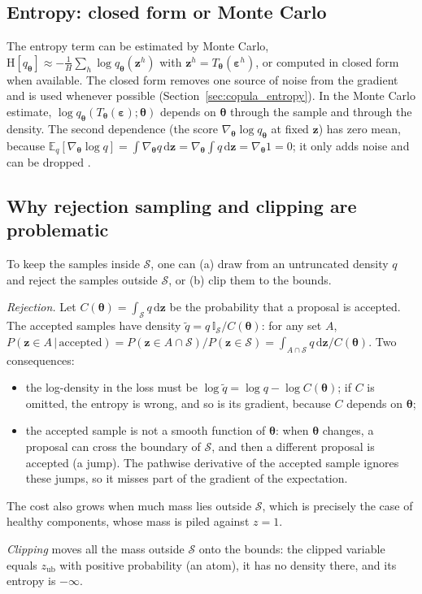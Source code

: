 \documentclass[11pt,a4paper]{article}
\numberwithin{equation}{section}
\theoremstyle{plain}
\theoremstyle{definition}
\theoremstyle{remark}
\newcommand{\z}{\mathbf{z}}
\newcommand{\eps}{\bm{\varepsilon}}
\newcommand{\thetab}{\bm{\theta}}
\newcommand{\Sset}{\mathcal{S}}
\newcommand{\E}{\mathbb{E}}
\newcommand{\Hent}{\mathrm{H}}
\newcommand{\dd}{\,\mathrm{d}}
\newcommand{\zub}{z_{\text{ub}}}
\newcommand{\qth}{q_{\bm{\theta}}}
\newcommand{\ind}{\mathbb{I}}
\begin{document}
\subsection{Entropy: closed form or Monte Carlo}
The entropy term can be estimated by Monte Carlo, $\Hent[\qth]\approx-\frac1H\sum_h\log\qth(\z^h)$ with $\z^h=T_{\thetab}(\eps^h)$, or computed in closed form when available. The closed form removes one source of noise from the gradient and is used whenever possible (Section~\ref{sec:copula_entropy}). In the Monte Carlo estimate, $\log\qth(T_{\thetab}(\eps);\thetab)$ depends on $\thetab$ through the sample and through the density. The second dependence (the score $\nabla_{\thetab}\log\qth$ at fixed $\z$) has zero mean, because $\E_q[\nabla_{\thetab}\log q]=\int\nabla_{\thetab}q\dd\z=\nabla_{\thetab}\int q\dd\z=\nabla_{\thetab}1=0$; it only adds noise and can be dropped \cite{roeder2017sticking}.

\subsection{Why rejection sampling and clipping are problematic}
\label{sec:rejection}
To keep the samples inside $\Sset$, one can (a) draw from an untruncated density $q$ and reject the samples outside $\Sset$, or (b) clip them to the bounds.

\emph{Rejection.} Let $C(\thetab)=\int_{\Sset} q\dd\z$ be the probability that a proposal is accepted. The accepted samples have density $\tilde q=q\,\ind_{\Sset}/C(\thetab)$: for any set $A$, $P(\z\in A\,|\,\text{accepted})=P(\z\in A\cap\Sset)/P(\z\in\Sset)=\int_{A\cap\Sset}q\dd\z/C(\thetab)$. Two consequences:
\begin{itemize}
\item the log-density in the loss must be $\log\tilde q=\log q-\log C(\thetab)$; if $C$ is omitted, the entropy is wrong, and so is its gradient, because $C$ depends on $\thetab$;
\item the accepted sample is not a smooth function of $\thetab$: when $\thetab$ changes, a proposal can cross the boundary of $\Sset$, and then a different proposal is accepted (a jump). The pathwise derivative of the accepted sample ignores these jumps, so it misses part of the gradient of the expectation.
\end{itemize}
The cost also grows when much mass lies outside $\Sset$, which is precisely the case of healthy components, whose mass is piled against $z=1$.

\emph{Clipping} moves all the mass outside $\Sset$ onto the bounds: the clipped variable equals $\zub$ with positive probability (an atom), it has no density there, and its entropy is $-\infty$.
\end{document}
